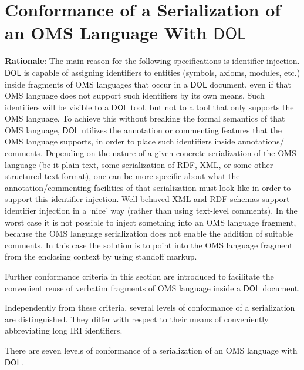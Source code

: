 \documentclass[10pt,fleqn,final]{scrreprt}
\newcommand*{\termref}[1]{\index{#1}#1\xspace}
\newcommand*{\DOL}{\ensuremath{\mathsf{DOL}}\xspace}
\newcommand{\sclause}[1]{\section{#1}}
\begin{document}
\sclause{Conformance of a Serialization of an OMS Language With \DOL}\label{c:conform:serialization}
\begin{fminipage}{\textwidth}
\textbf{Rationale}: The main reason for the following specifications is identifier injection. \DOL is capable
of assigning identifiers to entities (symbols, axioms, modules, etc.) inside fragments of OMS
languages that occur in a \DOL document, even if that OMS language does not support such identifiers
by its own means. 
Such identifiers will be visible to a \DOL tool, but not to a tool that only supports the OMS
language.  To achieve this without breaking the formal semantics of that OMS language,
  \DOL utilizes  the \termref{annotation} or commenting features that the OMS language supports, 
 in order to place such
identifiers inside annotations/ comments.  
Depending on the nature of a given concrete
serialization of the OMS language (be it plain text, some serialization of RDF, XML, or some other 
structured text format), one can be more specific about what the annotation/commenting facilities of
that serialization must look like in order to support this identifier injection.  
Well-behaved XML and RDF schemas support identifier injection in a `nice' way (rather than using
text-level comments).  In the worst case it is not possible to
inject something into an OMS language fragment, because the OMS language serialization 
does not enable the addition of suitable comments. In this case the solution is to point into the OMS language fragment from the enclosing context 
by using \termref{standoff markup}.


Further conformance criteria in this section are introduced to facilitate the convenient reuse of
verbatim fragments of OMS language inside a \DOL document.

Independently from these criteria,   several levels of conformance of a
serialization are distinguished. They differ with respect to their means of conveniently abbreviating long IRI identifiers. 
\end{fminipage}

 There are seven levels of conformance of a serialization of an OMS language with \DOL{}.
\end{document}
